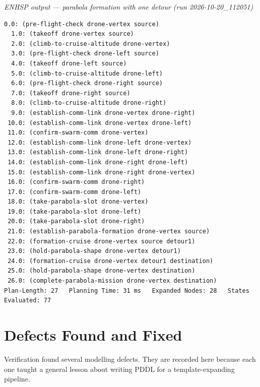 \documentclass[11pt,a4paper,oneside]{report}
\newcommand{\recordlabel}[1]{\par\smallskip\noindent\hspace*{1.2em}\textit{#1}\par}
\begin{document}
\recordlabel{ENHSP output --- parabola formation with one detour (run 2026-10-20\_112051)}
\begin{lstlisting}[style=plain]
  0.0: (pre-flight-check drone-vertex source)
  1.0: (takeoff drone-vertex source)
  2.0: (climb-to-cruise-altitude drone-vertex)
  3.0: (pre-flight-check drone-left source)
  4.0: (takeoff drone-left source)
  5.0: (climb-to-cruise-altitude drone-left)
  6.0: (pre-flight-check drone-right source)
  7.0: (takeoff drone-right source)
  8.0: (climb-to-cruise-altitude drone-right)
  9.0: (establish-comm-link drone-vertex drone-right)
 10.0: (establish-comm-link drone-vertex drone-left)
 11.0: (confirm-swarm-comm drone-vertex)
 12.0: (establish-comm-link drone-left drone-vertex)
 13.0: (establish-comm-link drone-left drone-right)
 14.0: (establish-comm-link drone-right drone-left)
 15.0: (establish-comm-link drone-right drone-vertex)
 16.0: (confirm-swarm-comm drone-right)
 17.0: (confirm-swarm-comm drone-left)
 18.0: (take-parabola-slot drone-vertex)
 19.0: (take-parabola-slot drone-left)
 20.0: (take-parabola-slot drone-right)
 21.0: (establish-parabola-formation drone-vertex source)
 22.0: (formation-cruise drone-vertex source detour1)
 23.0: (hold-parabola-shape drone-vertex detour1)
 24.0: (formation-cruise drone-vertex detour1 destination)
 25.0: (hold-parabola-shape drone-vertex destination)
 26.0: (complete-parabola-mission drone-vertex destination)
Plan-Length: 27   Planning Time: 31 ms   Expanded Nodes: 28   States Evaluated: 77
\end{lstlisting}

\section{Defects Found and Fixed}\label{sec:defects}
Verification found several modelling defects. They are recorded here because each one taught a
general lesson about writing PDDL for a template-expanding pipeline.
\end{document}

